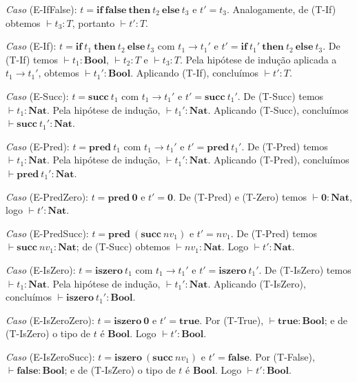 \emph{Caso} (E-IfFalse): \(t =
\mathbf{if}\ \mathbf{false}\ \mathbf{then}\ t_2\ \mathbf{else}\ t_3\)
e \(t' = t_3\). Analogamente, de (T-If) obtemos \(\vdash t_3 : T\),
portanto \(\vdash t' : T\).

\emph{Caso} (E-If): \(t =
\mathbf{if}\ t_1\ \mathbf{then}\ t_2\ \mathbf{else}\ t_3\) com \(t_1
\to t_1'\) e \(t' =
\mathbf{if}\ t_1'\ \mathbf{then}\ t_2\ \mathbf{else}\ t_3\). De
(T-If) temos \(\vdash t_1 : \mathbf{Bool}\), \(\vdash t_2 : T\) e
\(\vdash t_3 : T\). Pela hipótese de indução aplicada a \(t_1 \to
t_1'\), obtemos \(\vdash t_1' : \mathbf{Bool}\). Aplicando (T-If),
concluímos \(\vdash t' : T\).

\emph{Caso} (E-Succ): \(t = \mathbf{succ}\ t_1\) com \(t_1 \to t_1'\)
e \(t' = \mathbf{succ}\ t_1'\). De (T-Succ) temos \(\vdash t_1 :
\mathbf{Nat}\). Pela hipótese de indução, \(\vdash t_1' :
\mathbf{Nat}\). Aplicando (T-Succ), concluímos \(\vdash
\mathbf{succ}\ t_1' : \mathbf{Nat}\).

\emph{Caso} (E-Pred): \(t = \mathbf{pred}\ t_1\) com \(t_1 \to t_1'\)
e \(t' = \mathbf{pred}\ t_1'\). De (T-Pred) temos \(\vdash t_1 :
\mathbf{Nat}\). Pela hipótese de indução, \(\vdash t_1' :
\mathbf{Nat}\). Aplicando (T-Pred), concluímos \(\vdash
\mathbf{pred}\ t_1' : \mathbf{Nat}\).

\emph{Caso} (E-PredZero): \(t = \mathbf{pred}\ \mathbf{0}\) e \(t' =
\mathbf{0}\). De (T-Pred) e (T-Zero) temos \(\vdash \mathbf{0} :
\mathbf{Nat}\), logo \(\vdash t' : \mathbf{Nat}\).

\emph{Caso} (E-PredSucc): \(t =
\mathbf{pred}\ (\mathbf{succ}\ nv_1)\) e \(t' = nv_1\). De (T-Pred)
temos \(\vdash \mathbf{succ}\ nv_1 : \mathbf{Nat}\); de (T-Succ)
obtemos \(\vdash nv_1 : \mathbf{Nat}\). Logo \(\vdash t' : \mathbf{Nat}\).

\emph{Caso} (E-IsZero): \(t = \mathbf{iszero}\ t_1\) com \(t_1 \to
t_1'\) e \(t' = \mathbf{iszero}\ t_1'\). De (T-IsZero) temos \(\vdash
t_1 : \mathbf{Nat}\). Pela hipótese de indução, \(\vdash t_1' :
\mathbf{Nat}\). Aplicando (T-IsZero), concluímos \(\vdash
\mathbf{iszero}\ t_1' : \mathbf{Bool}\).

\emph{Caso} (E-IsZeroZero): \(t = \mathbf{iszero}\ \mathbf{0}\) e
\(t' = \mathbf{true}\). Por (T-True), \(\vdash \mathbf{true} :
\mathbf{Bool}\); e de (T-IsZero) o tipo de \(t\) é \(\mathbf{Bool}\).
Logo \(\vdash t' : \mathbf{Bool}\).

\emph{Caso} (E-IsZeroSucc): \(t =
\mathbf{iszero}\ (\mathbf{succ}\ nv_1)\) e \(t' = \mathbf{false}\).
Por (T-False), \(\vdash \mathbf{false} : \mathbf{Bool}\); e de
(T-IsZero) o tipo de \(t\) é \(\mathbf{Bool}\). Logo \(\vdash t' :
\mathbf{Bool}\).

